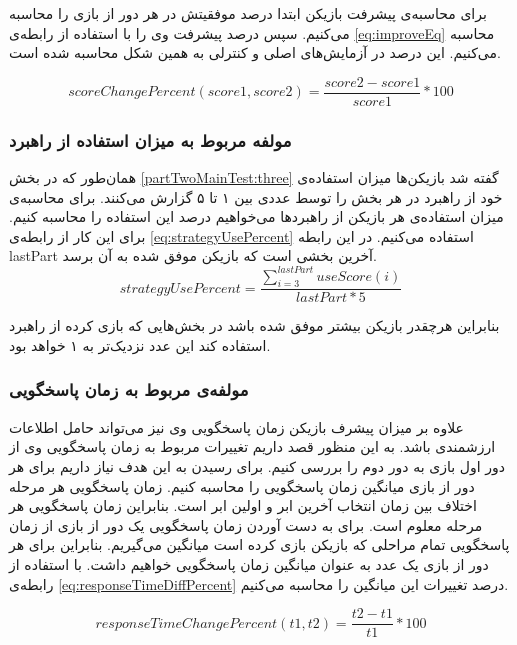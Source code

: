 \documentclass[twoside, a4paper,11pt]{book}
\numberwithin{equation}{chapter}
\numberwithin{table}{chapter}
\numberwithin{figure}{chapter}
\numberwithin{equation}{chapter}
\begin{document}
برای محاسبه‌ی پیشرفت بازیکن ابتدا درصد موفقیتش در هر دور از بازی را محاسبه می‌کنیم. سپس درصد پیشرفت وی را با استفاده از رابطه‌ی \ref{eq:improveEq} محاسبه می‌کنیم. این درصد در آزمایش‌های اصلی و کنترلی به همین شکل محاسبه شده است.

\begin{equation}
\label{eq:improveEq}
	scoreChangePercent(score1, score2) = \frac{score2 - score1}{score1}*100
\end{equation}

\subsubsection{مولفه مربوط به میزان استفاده از راهبرد}

همان‌طور که در بخش \ref{partTwoMainTest:three} گفته شد بازیکن‌ها میزان استفاده‌ی خود از راهبرد در هر بخش را توسط عددی بین ۱ تا ۵ گزارش می‌کنند. برای محاسبه‌ی میزان استفاده‌ی هر بازیکن از راهبردها می‌خواهیم درصد این استفاده را محاسبه کنیم. برای این کار از رابطه‌ی \ref{eq:strategyUsePercent} استفاده می‌کنیم. در این رابطه lastPart آخرین بخشی است که بازیکن موفق شده به آن برسد.
\begin{equation}
\label{eq:strategyUsePercent}
strategyUsePercent = \frac{\sum_{i=3}^{lastPart} useScore(i)}{lastPart*5}
\end{equation}

بنابراین هرچقدر بازیکن بیشتر موفق شده باشد در بخش‌هایی که بازی کرده از راهبرد استفاده کند این عدد نزدیک‌تر به ۱ خواهد بود.

\subsubsection{مولفه‌ی مربوط به زمان پاسخگویی}
علاوه بر میزان پیشرف بازیکن زمان پاسخگویی وی نیز می‌تواند حامل اطلاعات ارزشمندی باشد. به این منظور قصد داریم تغییرات مربوط به زمان پاسخگویی وی از دور اول بازی به دور دوم را بررسی کنیم. برای رسیدن به این هدف نیاز داریم برای هر دور از بازی میانگین زمان پاسخگویی را محاسبه کنیم. زمان پاسخگویی هر مرحله اختلاف بین زمان انتخاب آخرین ابر و اولین ابر است. بنابراین زمان پاسخگویی هر مرحله معلوم است. برای به دست آوردن زمان پاسخگویی یک دور از بازی از زمان پاسخگویی تمام مراحلی که بازیکن بازی کرده است میانگین می‌گیریم. بنابراین برای هر دور از بازی یک عدد به عنوان میانگین زمان پاسخگویی خواهیم داشت. با استفاده از رابطه‌ی \ref{eq:responseTimeDiffPercent} درصد تغییرات این میانگین را محاسبه می‌کنیم.

\begin{equation}
\label{eq:responseTimeDiffPercent}
	responseTimeChangePercent(t1, t2) = \frac{t2 - t1}{t1}*100
\end{equation}
\end{document}
